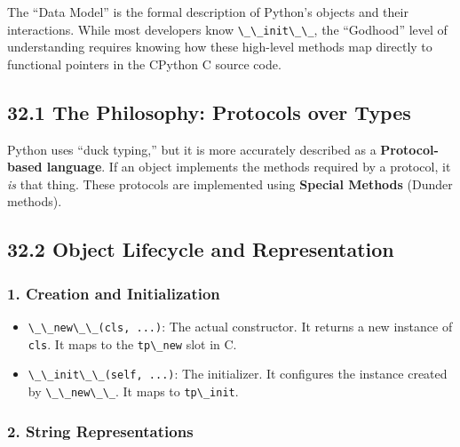 The ``Data Model'' is the formal description of Python's objects and
their interactions. While most developers know
\passthrough{\lstinline!\_\_init\_\_!}, the ``Godhood'' level of
understanding requires knowing how these high-level methods map directly
to functional pointers in the CPython C source code.

\hypertarget{the-philosophy-protocols-over-types}{%
\subsection{32.1 The Philosophy: Protocols over
Types}\label{the-philosophy-protocols-over-types}}

Python uses ``duck typing,'' but it is more accurately described as a
\textbf{Protocol-based language}. If an object implements the methods
required by a protocol, it \emph{is} that thing. These protocols are
implemented using \textbf{Special Methods} (Dunder methods).

\hypertarget{object-lifecycle-and-representation}{%
\subsection{32.2 Object Lifecycle and
Representation}\label{object-lifecycle-and-representation}}

\hypertarget{creation-and-initialization}{%
\subsubsection{1. Creation and
Initialization}\label{creation-and-initialization}}

\begin{itemize}
\tightlist
\item
  \passthrough{\lstinline!\_\_new\_\_(cls, ...)!}: The actual
  constructor. It returns a new instance of
  \passthrough{\lstinline!cls!}. It maps to the
  \passthrough{\lstinline!tp\_new!} slot in C.
\item
  \passthrough{\lstinline!\_\_init\_\_(self, ...)!}: The initializer. It
  configures the instance created by
  \passthrough{\lstinline!\_\_new\_\_!}. It maps to
  \passthrough{\lstinline!tp\_init!}.
\end{itemize}

\hypertarget{string-representations}{%
\subsubsection{2. String Representations}\label{string-representations}}

